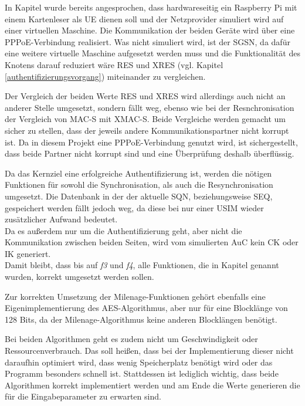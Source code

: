  In Kapitel  wurde bereits angesprochen, dass hardwareseitig
 ein Raspberry Pi mit einem Kartenleser als \ac{UE} dienen soll und der Netzprovider
 simuliert wird auf einer virtuellen Maschine. Die Kommunikation der beiden Geräte
 wird über eine \ac{PPPoE}-Verbindung realisiert. Was nicht simuliert wird, ist der
 \ac{SGSN}, da dafür eine weitere virtuelle Maschine aufgesetzt werden muss und die
 Funktionalität des Knotens darauf reduziert wäre RES und XRES (vgl. Kapitel \ref{authentifizierungsvorgang})
 miteinander zu vergleichen.
 
 Der Vergleich der beiden Werte RES und XRES wird allerdings auch nicht an anderer
 Stelle umgesetzt, sondern fällt weg, ebenso wie bei der Resnchronisation der Vergleich
 von MAC-S mit XMAC-S. Beide Vergleiche werden gemacht um sicher zu stellen, dass
 der jeweils andere Kommunikationspartner nicht korrupt ist. Da in diesem Projekt eine
 PPPoE-Verbindung genutzt wird, ist sichergestellt, dass beide Partner nicht korrupt sind
 und eine Überprüfung deshalb überflüssig.
 
 Da das Kernziel eine erfolgreiche Authentifizierung ist, werden die nötigen Funktionen
 für sowohl die Synchronisation, als auch die Resynchronisation umgesetzt. Die Datenbank
 in der der aktuelle SQN, beziehungsweise SEQ, gespeichert werden fällt jedoch weg, da
 diese bei nur einer USIM wieder zusätzlicher Aufwand bedeutet. \\
 Da es außerdem nur um die Authentifizierung geht, aber nicht die Kommunikation zwischen
 beiden Seiten, wird vom simulierten AuC kein CK oder IK generiert. \\
 Damit bleibt, dass bis auf \emph{f3} und \emph{f4}, alle Funktionen, die in Kapitel 
 genannt wurden, korrekt umgesetzt werden sollen.
 
 Zur korrekten Umsetzung der Milenage-Funktionen gehört ebenfalls eine Eigen\-implementierung
 des AES-Algorithmus, aber nur für eine Blocklänge von 128 Bits, da der Milenage-Algorithmus
 keine anderen Blocklängen benötigt.
 
 Bei beiden Algorithmen geht es zudem nicht um Geschwindigkeit oder Ressourcenverbrauch.
 Das soll heißen, dass bei der Implementierung dieser nicht daraufhin optimiert wird, dass wenig
 Speicherplatz benötigt wird oder das Programm besonders schnell ist. Stattdessen ist lediglich
 wichtig, dass beide Algorithmen korrekt implementiert werden und am Ende die Werte generieren
 die für die Eingabeparameter zu erwarten sind.
 
